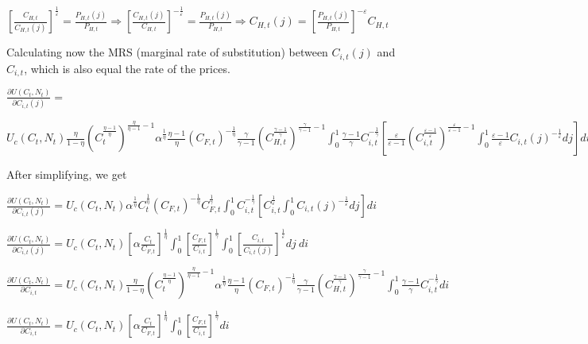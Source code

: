 \documentclass[
]{article}
\begin{document}
\(\displaystyle \left[\frac{C_{H,t}}{C_{H,t}(j)}\right]^{\frac{1}{\varepsilon}} = \frac{P_{H,t}(j)}{P_{H,t}} \Rightarrow \left[\frac{C_{H,t}(j)}{C_{H,t}}\right]^{-\frac{1}{\varepsilon}} = \frac{P_{H,t}(j)}{P_{H,t}} \Rightarrow C_{H,t}(j)= \left[ \frac{P_{H,t}(j)}{P_{H,t}} \right]^{-\varepsilon}C_{H,t}\)

Calculating now the MRS (marginal rate of substitution) between
\(C_{i,t}(j)\) and \(C_{i,t}\), which is also equal the rate of the
prices.

\(\displaystyle \frac{\partial U(C_t,N_t)}{\partial C_{i,t}(j)} =\)

\(\displaystyle U_c(C_t,N_t)\frac{\eta}{1-\eta}\left( C_t^{\frac{\eta-1}{\eta}} \right)^{\frac{\eta}{\eta-1}-1} \alpha^{\frac{1}{\eta}}\frac{\eta-1}{\eta}\left( C_{F,t}\right)^{-\frac{1}{\eta}}\frac{\gamma}{\gamma-1}\left(C_{H,t}^{\frac{\gamma-1}{\gamma}} \right)^{\frac{\gamma}{\gamma-1}-1}\int_0^1 \frac{\gamma-1}{\gamma} C_{i,t}^{-\frac{1}{\gamma}}\left[ \frac{\varepsilon}{\varepsilon-1}\left(C_{i,t}^{\frac{\varepsilon-1}{\varepsilon}} \right)^{\frac{\varepsilon}{\varepsilon-1}-1}\int_0^1 \frac{\varepsilon-1}{\varepsilon} C_{i,t}(j)^{-\frac{1}{\varepsilon}}dj \right]di\)

After simplifying, we get

\(\displaystyle \frac{\partial U(C_t,N_t)}{\partial C_{i,t}(j)} = U_c(C_t,N_t) \alpha^{\frac{1}{\eta}} C_t^{\frac{1}{\eta}}\left( C_{F,t}\right)^{-\frac{1}{\eta}}C_{F,t}^{\frac{1}{\gamma}} \int_0^1 C_{i,t}^{-\frac{1}{\gamma}} \left[ C_{i,t}^\frac{1}{\varepsilon} \int_0^1 C_{i,t}(j)^{-\frac{1}{\varepsilon}}dj \right] di\)

\(\displaystyle \frac{\partial U(C_t,N_t)}{\partial C_{i,t}(j)} = U_c(C_t,N_t) \left[ \alpha \frac{C_t}{C_{F,t}} \right]^{\frac{1}{\eta}} \int_0^1 \left[\frac{C_{F,t}}{C_{i,t}}\right]^{\frac{1}{\gamma}} \int_0^1 \left[\frac{C_{i,t}}{C_{i,t}(j)}\right]^{\frac{1}{\varepsilon}}dj \ di\)

\(\displaystyle \frac{\partial U(C_t,N_t)}{\partial C_{i,t}} = U_c(C_t,N_t)\frac{\eta}{1-\eta}\left( C_t^{\frac{\eta-1}{\eta}} \right)^{\frac{\eta}{\eta-1}-1} \alpha^{\frac{1}{\eta}}\frac{\eta-1}{\eta}\left( C_{F,t}\right)^{-\frac{1}{\eta}}\frac{\gamma}{\gamma-1}\left(C_{H,t}^{\frac{\gamma-1}{\gamma}} \right)^{\frac{\gamma}{\gamma-1}-1}\int_0^1 \frac{\gamma-1}{\gamma} C_{i,t}^{-\frac{1}{\gamma}}di\)

\(\displaystyle \frac{\partial U(C_t,N_t)}{\partial C_{i,t}} = U_c(C_t,N_t) \left[ \alpha \frac{C_t}{C_{F,t}} \right]^{\frac{1}{\eta}} \int_0^1 \left[\frac{C_{F,t}}{C_{i,t}}\right]^{\frac{1}{\gamma}} di\)
\end{document}
